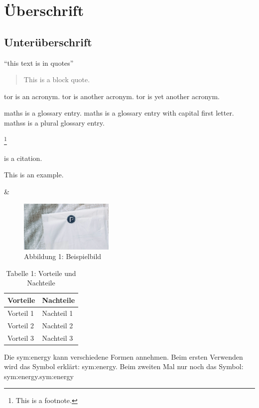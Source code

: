 
\section{Überschrift} \label{sec:Section}

\lipsum[1]


\subsection{Unterüberschrift} \label{subsec:Subsection}



\enquote{this text is in quotes}

\begin{quote}
This is a block quote.
\end{quote}

\acrfull{tor} is an acronym.
\acrshort{tor} is another acronym.
\acrlong{tor} is yet another acronym.


\gls{maths} is a glossary entry.
\Gls{maths} is a glossary entry with capital first letter.
\glspl{maths} is a plural glossary entry.

\footnote{This is a footnote.}

\cite{nguyen_machine_2018} is a citation.

\zB This is an example.


\& 

\begin{figure}[h]
    \centering
    \includegraphics[width=0.4\textwidth]{images/image1.png}
    \caption{Abbildung 1: Beispielbild}
    \label{fig:bild}
\end{figure}

\begin{table}[h]
    \centering
    \begin{tabular}{|p{5cm}|p{5cm}|}
        \hline
        \textbf{Vorteile} & \textbf{Nachteile} \\
        \hline
        Vorteil 1 & Nachteil 1 \\
        Vorteil 2 & Nachteil 2 \\
        Vorteil 3 & Nachteil 3 \\
        \hline
    \end{tabular}
    \caption{Tabelle 1: Vorteile und Nachteile}
    \label{tab:Tabelle1}
\end{table}

Die \gls{sym:energy} kann verschiedene Formen annehmen.
Beim ersten Verwenden wird das Symbol erklärt: \gls{sym:energy}.
Beim zweiten Mal nur noch das Symbol: \gls{sym:energy}.\gls{sym:energy}
